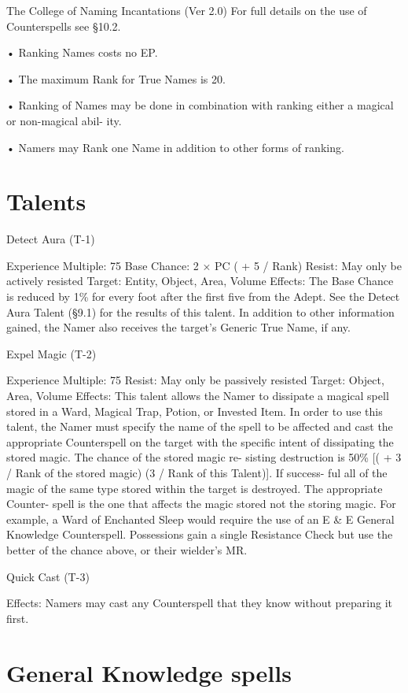 \begin{Chapter}{The College of Naming Incantations (Ver 2.0)}
For  full  details  on  the  use  of  Counterspells  see 
§10.2. 

• Ranking Names costs no EP.  

• The maximum Rank for True Names is 20.  

•  Ranking  of  Names  may  be  done  in  combination 
with ranking either a magical or non-magical abil-
ity.  

• Namers may Rank one Name in addition to other 
forms of ranking. 


\section{Talents}

Detect Aura (T-1) 

Experience Multiple: 75 
Base Chance: 2 × PC ( + 5 / Rank) 
Resist: May only be actively resisted 
Target: Entity, Object, Area, Volume 
Effects:  The  Base  Chance  is  reduced  by  1\%  for 
every  foot  after  the  first  five  from  the  Adept.  See 
the Detect Aura Talent (§9.1) for the results of this 
talent.  In  addition  to  other  information  gained,  the 
Namer  also  receives  the  target’s  Generic  True 
Name, if any. 

Expel Magic (T-2) 

Experience Multiple: 75 
Resist: May only be passively resisted 
Target: Object, Area, Volume 
Effects: This talent allows the Namer to dissipate a 
magical  spell  stored  in  a  Ward,  Magical  Trap, 
Potion, or Invested Item. In order to use this talent, 
the Namer must specify the name of the spell to be 
affected  and  cast  the  appropriate  Counterspell  on 
the target with the specific intent of dissipating the 
stored  magic.  The  chance  of  the  stored  magic  re-
sisting  destruction  is  50\%  [(  +  3  /  Rank  of  the 
stored magic) (3 / Rank of this Talent)]. If success-
ful all of the magic of the same type stored within 
the  target  is  destroyed.  The  appropriate  Counter-
spell is the one that affects the magic stored not the 
storing  magic.  For  example,  a  Ward  of  Enchanted 
Sleep  would  require  the  use  of  an  E  \&  E  General 
Knowledge Counterspell. Possessions gain a single 
Resistance  Check  but  use  the  better  of  the  chance 
above, or their wielder’s MR. 

Quick Cast (T-3) 

Effects:  Namers  may  cast  any  Counterspell  that 
they know without preparing it first. 


\section{General Knowledge spells}


\end{Chapter}
